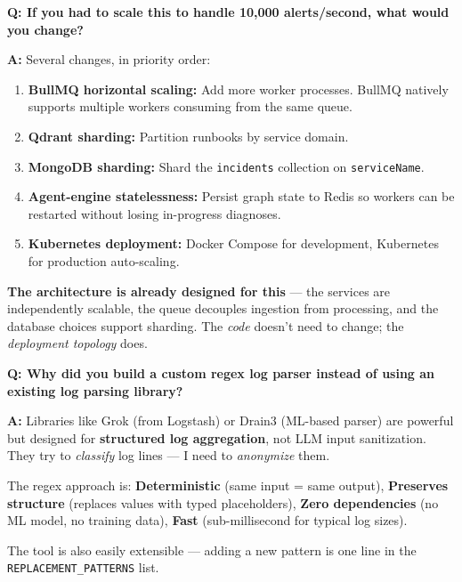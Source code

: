 \documentclass[11pt,a4paper]{article}
\begin{document}
\begin{interviewbox}
\textbf{Q: If you had to scale this to handle 10,000 alerts/second, what would you change?}

\textbf{A:} Several changes, in priority order:

\begin{enumerate}[leftmargin=*,itemsep=2pt]
  \item \textbf{BullMQ horizontal scaling:} Add more worker processes. BullMQ natively supports multiple workers consuming from the same queue.
  \item \textbf{Qdrant sharding:} Partition runbooks by service domain.
  \item \textbf{MongoDB sharding:} Shard the \texttt{incidents} collection on \texttt{serviceName}.
  \item \textbf{Agent-engine statelessness:} Persist graph state to Redis so workers can be restarted without losing in-progress diagnoses.
  \item \textbf{Kubernetes deployment:} Docker Compose for development, Kubernetes for production auto-scaling.
\end{enumerate}

\textbf{The architecture is already designed for this} — the services are independently
scalable, the queue decouples ingestion from processing, and the database choices support
sharding. The \textit{code} doesn't need to change; the \textit{deployment topology} does.
\end{interviewbox}

\begin{interviewbox}
\textbf{Q: Why did you build a custom regex log parser instead of using an existing log parsing library?}

\textbf{A:} Libraries like Grok (from Logstash) or Drain3 (ML-based parser) are powerful but
designed for \textbf{structured log aggregation}, not LLM input sanitization. They try to
\textit{classify} log lines — I need to \textit{anonymize} them.

The regex approach is: \textbf{Deterministic} (same input = same output), \textbf{Preserves structure} (replaces values with typed placeholders), \textbf{Zero dependencies} (no ML model, no training data), \textbf{Fast} (sub-millisecond for typical log sizes).

The tool is also easily extensible — adding a new pattern is one line in the
\texttt{REPLACEMENT\_PATTERNS} list.
\end{interviewbox}
\end{document}
